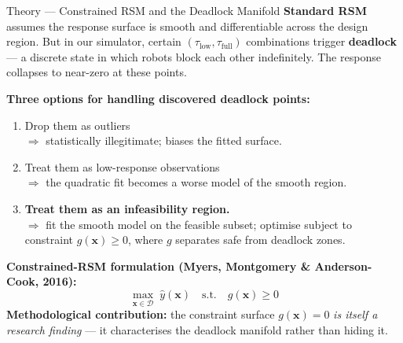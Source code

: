 \documentclass[aspectratio=169,10pt]{beamer}
\begin{document}
\begin{frame}{Theory --- Constrained RSM and the Deadlock Manifold}
  \footnotesize
  \textbf{Standard RSM} assumes the response surface is smooth and differentiable across the design region. But in our simulator, certain $(\tau_\text{low}, \tau_\text{full})$ combinations trigger \textbf{deadlock} --- a discrete state in which robots block each other indefinitely. The response collapses to near-zero at these points.

  \vspace{0.4em}
  \textbf{Three options for handling discovered deadlock points:}
  \begin{enumerate}
    \item Drop them as outliers \\ $\Rightarrow$ statistically illegitimate; biases the fitted surface.
    \item Treat them as low-response observations \\ $\Rightarrow$ the quadratic fit becomes a worse model of the smooth region.
    \item \textbf{Treat them as an infeasibility region.} \\ $\Rightarrow$ fit the smooth model on the feasible subset; optimise subject to constraint $g(\boldsymbol{x}) \geq 0$, where $g$ separates safe from deadlock zones.
  \end{enumerate}

  \vspace{0.4em}
  \textbf{Constrained-RSM formulation (Myers, Montgomery \& Anderson-Cook, 2016):}
  \[
    \max_{\boldsymbol{x} \in \mathcal{D}}\; \hat{y}(\boldsymbol{x}) \quad \text{s.t.}\quad g(\boldsymbol{x}) \geq 0
  \]
  \textbf{Methodological contribution:} the constraint surface $g(\boldsymbol{x}) = 0$ \emph{is itself a research finding} --- it characterises the deadlock manifold rather than hiding it.
\end{frame}
\end{document}
